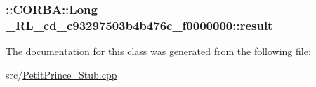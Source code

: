 \subsubsection[{\texorpdfstring{result}{result}}]{\setlength{\rightskip}{0pt plus 5cm}\+::C\+O\+R\+B\+A\+::\+Long \+\_\+R\+L\+\_\+cd\+\_\+c93297503b4b476c\+\_\+f0000000\+::result}\hypertarget{class__0_r_l__cd__c93297503b4b476c__f0000000_a2a668d01c3ab8f7a926dd60b837aa99d}{}\label{class__0_r_l__cd__c93297503b4b476c__f0000000_a2a668d01c3ab8f7a926dd60b837aa99d}


The documentation for this class was generated from the following file\+:\begin{DoxyCompactItemize}
\item 
src/\hyperlink{_petit_prince___stub_8cpp}{Petit\+Prince\+\_\+\+Stub.\+cpp}\end{DoxyCompactItemize}
